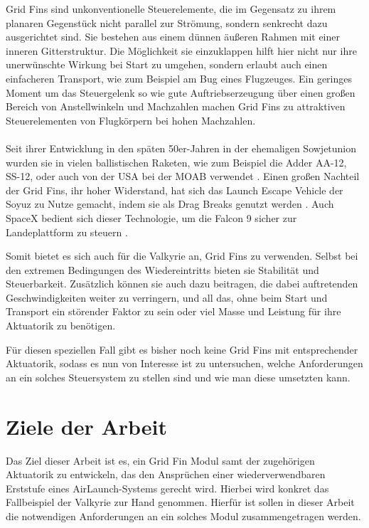 Grid Fins sind unkonventionelle Steuerelemente, die im Gegensatz zu ihrem planaren Gegenstück nicht parallel zur Strömung, sondern senkrecht dazu ausgerichtet sind. Sie bestehen aus einem dünnen äußeren Rahmen mit einer inneren Gitterstruktur. Die Möglichkeit sie einzuklappen hilft hier nicht nur ihre unerwünschte Wirkung bei Start zu umgehen, sondern erlaubt auch einen einfacheren Transport, wie zum Beispiel am Bug eines Flugzeuges. Ein geringes Moment um das Steuergelenk so wie gute Auftriebserzeugung über einen großen Bereich von Anstellwinkeln und Machzahlen \cite{vergleichPlanar} machen Grid Fins zu attraktiven Steuerelementen von Flugkörpern bei hohen Machzahlen.
\\~\\
Seit ihrer Entwicklung in den späten 50er-Jahren in der ehemaligen Sowjetunion wurden sie in vielen ballistischen Raketen, wie zum Beispiel die Adder AA-12, SS-12, oder auch von der USA bei der \gls{MOAB} verwendet \cite{sehnenlaenge}. Einen großen Nachteil der Grid Fins, ihr hoher Widerstand, hat sich das Launch Escape Vehicle der Soyuz zu Nutze gemacht, indem sie als Drag Breaks genutzt werden \cite{sehnenlaenge}. Auch SpaceX bedient sich dieser Technologie, um die Falcon 9 sicher zur Landeplattform zu steuern \cite{sehnenlaenge}.

Somit bietet es sich auch für die Valkyrie an, Grid Fins zu verwenden. Selbst bei den extremen Bedingungen des Wiedereintritts bieten sie Stabilität und Steuerbarkeit. Zusätzlich können sie auch dazu beitragen, die dabei auftretenden Geschwindigkeiten weiter zu verringern, und all das, ohne beim Start und Transport ein störender Faktor zu sein oder viel Masse und Leistung für ihre Aktuatorik zu benötigen.

Für diesen speziellen Fall gibt es bisher noch keine Grid Fins mit entsprechender Aktuatorik, sodass es nun von Interesse ist zu untersuchen, welche Anforderungen an ein solches Steuersystem zu stellen sind und wie man diese umsetzten kann.

\section{Ziele der Arbeit}
Das Ziel dieser Arbeit ist es, ein Grid Fin Modul samt der zugehörigen Aktuatorik zu entwickeln, das den Ansprüchen einer wiederverwendbaren Erststufe eines AirLaunch-Systems gerecht wird. Hierbei wird konkret das Fallbeispiel der Valkyrie zur Hand genommen.
Hierfür ist sollen in dieser Arbeit die notwendigen Anforderungen an ein solches Modul zusammengetragen werden.

